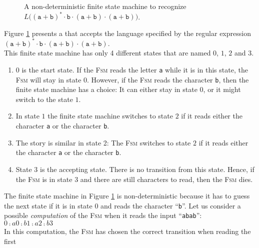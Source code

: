 \begin{figure}[!ht]
  \centering
   \caption{A non-deterministic finite state machine to recognize 
           $L\bigl((\texttt{a}+\texttt{b})^* \cdot \texttt{b} \cdot (\texttt{a}+\texttt{b}) \cdot (\texttt{a}+\texttt{b})\bigr)$.}
  \label{fig:abstarbabab-nd.dot}
\end{figure}
\noindent
Figure \ref{fig:abstarbabab-nd.dot} presents a  that accepts
the language specified by the regular expression
\\[0.2cm]
\hspace*{1.3cm}
$(\texttt{a}+\texttt{b})^* \cdot \texttt{b} \cdot (\texttt{a}+\texttt{b}) \cdot (\texttt{a}+\texttt{b})$.
\\[0.2cm]
This finite state machine has only 4 different states that are named $0$, $1$, $2$ and $3$.
\begin{enumerate}
\item $0$ is the start state.  If the \textsc{Fsm} reads the letter \texttt{a} while it is in this
      state, the \textsc{Fsm} will stay in state 0.  However, if the \textsc{Fsm} reads the
      character \texttt{b}, then the finite state machine has a choice:  It can either stay in state
      $0$, or it might switch to the state $1$.
\item In state $1$ the finite state machine switches to state $2$ if it reads either the character
      \texttt{a} or the character \texttt{b}.
\item The story is similar in state 2: The \textsc{Fsm} switches to state $2$ if it reads either the character
      \texttt{a} or the character \texttt{b}.
\item State  $3$ is the accepting state.  There is no transition from this state.  Hence, if the
      \textsc{Fsm} is in state 3 and there are still characters to read, then the \textsc{Fsm} dies.
\end{enumerate}
The finite state machine in Figure \ref{fig:abstarbabab-nd.dot} is non-deterministic because it has
to guess the next state if it is in state 0 and reads the character ``\texttt{b}''.  Let us consider a possible
\emph{computation} of the \textsc{Fsm} when it reads the input ``\texttt{abab}'':
\\[0.2cm]
\hspace*{1.3cm}
$0 \comp{a} 0 \comp{b} 1 \comp{a} 2 \comp{b} 3$
\\[0.2cm]
In this computation, the \textsc{Fsm} has chosen the correct transition when reading the first
